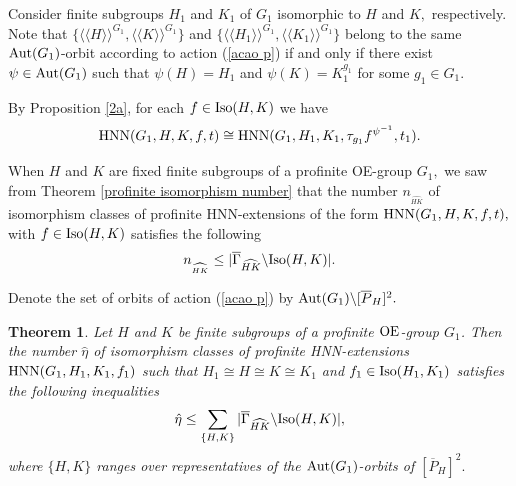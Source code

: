 \documentclass[a4paper,12pt]{article}
\newtheorem{thm}{Theorem}[section]
\newtheorem{deff}[thm]{Definition}
\def\OE{{\rm OE}}
\def\aut {{\rm Aut}}
\def\inn {{\rm Inn}}
\def\hnn {{\rm HNN}}
\def\Iso {{\rm Iso}}
\begin{document}
{Consider  finite subgroups $H_1$ and $K_1$ of $G_1$ isomorphic to $H$ and $K,$ respectively.  Note that $\{ \langle\langle H\rangle\rangle^{G_1}
, \langle\langle K\rangle\rangle^{G_1}
 \}$ and $\{ \langle\langle H_1\rangle\rangle^{G_1}
, \langle\langle K_1\rangle\rangle^{G_1}
 \}$ belong to the same $\aut(G_1)$-orbit according to action (\ref{acao p}) if and only if  there exist $\psi\in \aut(G_1)$ such that $\psi(H)=H_1$ and $\psi(K)=K_1^{g_1}$ for some $g_1\in G_1.$ 


 By Proposition  \ref{2a}, for each $f\in \Iso(H,K)$ we have $$\hnn(G_1, H, K, f,t) \cong \hnn(G_1, H_1, K_1, \tau_{g_1}f^{\psi^{-1}},t_1).$$


When $H$ and $K$ are fixed finite subgroups of a profinite OE-group $G_1,$ we saw from Theorem \ref{profinite isomorphism number} that the number $n_{_{\widehat{HK}}}$ of isomorphism classes of profinite HNN-extensions of the form $\hnn(G_1, H, K, f, t),$ with $f \in \Iso(H, K)$ satisfies the following $$n_{_{\widehat{HK}}} \leq | \overline{\Gamma}_{\widehat{HK}} \backslash \Iso(H, K)|.$$ 

Denote the set of orbits of action (\ref{acao p}) by $\aut(G_1)\backslash [\overline{P}_H]^2.$  %


\begin{thm}\label{profinite problem} Let $H$ and $K$ be finite subgroups of a profinite  $\OE$-group $G_1$. Then the number $\hat \eta$ of isomorphism classes of profinite HNN-extensions $\hnn(G_1, H_1, K_1, f_1)$ such that %
$H_1 \cong H \cong K \cong  K_1$ and $f_1 \in \Iso(H_1, K_1)$ satisfies the following inequalities $$\hat \eta\leq \sum_{\{H, K\}} | \overline{\Gamma}_{\widehat{HK}} \backslash \Iso(H, K)|,$$ where $\{H, K\}$ ranges over  representatives of the $\aut(G_1)$-orbits of $[\overline{P}_H]^2.$
\end{thm} 


}
\end{document}
